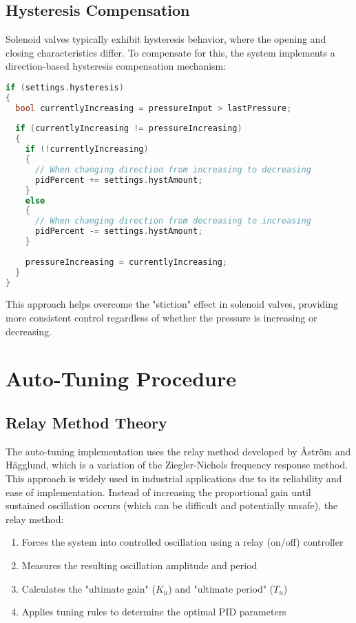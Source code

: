 \documentclass[a4paper,11pt]{article}
\begin{document}
\subsection{Hysteresis Compensation}

Solenoid valves typically exhibit hysteresis behavior, where the opening and closing characteristics differ. To compensate for this, the system implements a direction-based hysteresis compensation mechanism:

\begin{lstlisting}[language=C++, caption=Hysteresis Compensation]
if (settings.hysteresis) 
{
  bool currentlyIncreasing = pressureInput > lastPressure;
  
  if (currentlyIncreasing != pressureIncreasing) 
  {
    if (!currentlyIncreasing) 
    {
      // When changing direction from increasing to decreasing
      pidPercent += settings.hystAmount;
    }
    else 
    {
      // When changing direction from decreasing to increasing
      pidPercent -= settings.hystAmount;
    }
    
    pressureIncreasing = currentlyIncreasing;
  }
}
\end{lstlisting}

This approach helps overcome the "stiction" effect in solenoid valves, providing more consistent control regardless of whether the pressure is increasing or decreasing.

\section{Auto-Tuning Procedure}

\subsection{Relay Method Theory}

The auto-tuning implementation uses the relay method developed by Åström and Hägglund\cite{astrom1984automatic}, which is a variation of the Ziegler-Nichols frequency response method\cite{ziegler1942optimum}. This approach is widely used in industrial applications due to its reliability and ease of implementation\cite{wiki:pidtuning}. Instead of increasing the proportional gain until sustained oscillation occurs (which can be difficult and potentially unsafe), the relay method:

\begin{enumerate}
    \item Forces the system into controlled oscillation using a relay (on/off) controller
    \item Measures the resulting oscillation amplitude and period
    \item Calculates the "ultimate gain" ($K_u$) and "ultimate period" ($T_u$)
    \item Applies tuning rules to determine the optimal PID parameters
\end{enumerate}
\end{document}
